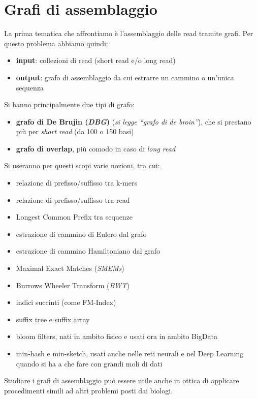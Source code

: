 \documentclass[a4paper,12pt, oneside]{book}
\begin{document}
\chapter{Grafi di assemblaggio}
La prima tematica che affrontiamo è l'assemblaggio delle read tramite grafi. Per
questo problema abbiamo quindi:
\begin{itemize}
  \item \textbf{input}: collezioni di read (short read e/o long read)
  \item \textbf{output}: grafo di assemblaggio da cui estrarre un cammino o
  un'unica sequenza
\end{itemize}
Si hanno principalmente due tipi di grafo:
\begin{itemize}
  \item \textbf{grafo di De Brujin (\textit{DBG})} (\textit{si legge ``grafo di
    de broin''}), che si prestano più per \textit{short read} (da 100 o 150
  basi) 
  \item \textbf{grafo di overlap}, più comodo in caso di \textit{long read}
\end{itemize}
Si useranno per questi scopi varie nozioni, tra cui:
\begin{itemize}
  \item relazione di prefisso/suffisso tra k-mers
  \item relazione di prefisso/suffisso tra read
  \item Longest Common Prefix tra sequenze
  \item estrazione di cammino di Eulero dal grafo
  \item estrazione di cammino Hamiltoniano dal grafo
  \item Maximal Exact Matches (\textit{SMEMs})
  \item Burrows Wheeler Transform (\textit{BWT})
  \item indici succinti (come FM-Index)
  \item suffix tree e suffix array
  \item bloom filters, nati in ambito fisico e usati ora in ambito BigData
  \item min-hash e min-sketch, usati anche nelle reti neurali e nel Deep
  Learning quando si ha a che fare con grandi moli di dati
\end{itemize}
Studiare i grafi di assemblaggio può essere utile anche in ottica di applicare
procedimenti simili ad altri problemi posti dai biologi.
\end{document}
